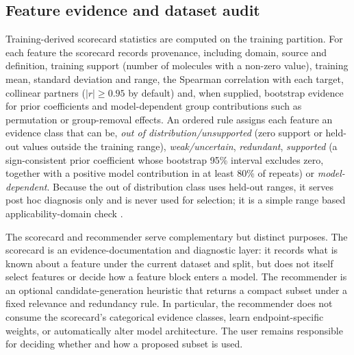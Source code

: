\subsection{Feature evidence and dataset audit}\label{subsec:feature-evidence}

Training-derived scorecard statistics are computed on the training partition. For each feature the scorecard records provenance, including domain, source and definition, training support (number of molecules with a non-zero value), training mean, standard deviation and range, the Spearman correlation with each target, collinear partners ($|r|\geq0.95$ by default) and, when supplied, bootstrap evidence for prior coefficients and model-dependent group contributions such as permutation or group-removal effects. An ordered rule assigns each feature an evidence class that can be, \emph{out of distribution/unsupported} (zero support or held-out values outside the training range), \emph{weak/uncertain}, \emph{redundant}, \emph{supported} (a sign-consistent prior coefficient whose bootstrap 95\% interval excludes zero, together with a positive model contribution in at least 80\% of repeats) or \emph{model-dependent}. Because the out of distribution class uses held-out ranges, it serves post hoc diagnosis only and is never used for selection; it is a simple range based applicability-domain check \cite{netzeva2005ad,sahigara2012ad}.

The scorecard and recommender serve complementary but distinct purposes. The scorecard is an evidence-documentation and diagnostic layer: it records what is known about a feature under the current dataset and split, but does not itself select features or decide how a feature block enters a model. The recommender is an optional candidate-generation heuristic that returns a compact subset under a fixed relevance and redundancy rule. In particular, the recommender does not consume the scorecard's categorical evidence classes, learn endpoint-specific weights, or automatically alter model architecture. The user remains responsible for deciding whether and how a proposed subset is used.

